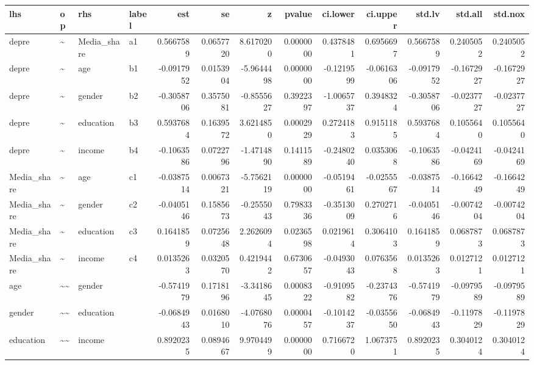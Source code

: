 \documentclass[
]{article}
\begin{document}
\begin{table}[!h]
\centering
\begin{tabular}[t]{llllrrrrrrrrr}
\toprule
lhs & op & rhs & label & est & se & z & pvalue & ci.lower & ci.upper & std.lv & std.all & std.nox\\
\midrule
depre & \textasciitilde{} & Media\_share & a1 & 0.5667589 & 0.0657720 & 8.6170200 & 0.0000000 & 0.4378481 & 0.6956697 & 0.5667589 & 0.2405052 & 0.2405052\\
depre & \textasciitilde{} & age & b1 & -0.0917952 & 0.0153904 & -5.9644498 & 0.0000000 & -0.1219599 & -0.0616306 & -0.0917952 & -0.1672927 & -0.1672927\\
depre & \textasciitilde{} & gender & b2 & -0.3058706 & 0.3575081 & -0.8555627 & 0.3922397 & -1.0065737 & 0.3948324 & -0.3058706 & -0.0237727 & -0.0237727\\
depre & \textasciitilde{} & education & b3 & 0.5937684 & 0.1639572 & 3.6214850 & 0.0002929 & 0.2724183 & 0.9151185 & 0.5937684 & 0.1055640 & 0.1055640\\
depre & \textasciitilde{} & income & b4 & -0.1063586 & 0.0722796 & -1.4714890 & 0.1411589 & -0.2480240 & 0.0353068 & -0.1063586 & -0.0424169 & -0.0424169\\
\addlinespace
Media\_share & \textasciitilde{} & age & c1 & -0.0387514 & 0.0067321 & -5.7562119 & 0.0000000 & -0.0519461 & -0.0255567 & -0.0387514 & -0.1664249 & -0.1664249\\
Media\_share & \textasciitilde{} & gender & c2 & -0.0405146 & 0.1585673 & -0.2555043 & 0.7983336 & -0.3513009 & 0.2702716 & -0.0405146 & -0.0074204 & -0.0074204\\
Media\_share & \textasciitilde{} & education & c3 & 0.1641859 & 0.0725648 & 2.2626094 & 0.0236598 & 0.0219614 & 0.3064103 & 0.1641859 & 0.0687873 & 0.0687873\\
Media\_share & \textasciitilde{} & income & c4 & 0.0135263 & 0.0320570 & 0.4219442 & 0.6730657 & -0.0493043 & 0.0763568 & 0.0135263 & 0.0127121 & 0.0127121\\
age & \textasciitilde{}\textasciitilde{} & gender &  & -0.5741979 & 0.1718196 & -3.3418645 & 0.0008322 & -0.9109582 & -0.2374376 & -0.5741979 & -0.0979589 & -0.0979589\\
\addlinespace
gender & \textasciitilde{}\textasciitilde{} & education &  & -0.0684943 & 0.0168010 & -4.0768076 & 0.0000457 & -0.1014237 & -0.0355650 & -0.0684943 & -0.1197829 & -0.1197829\\
education & \textasciitilde{}\textasciitilde{} & income &  & 0.8920235 & 0.0894667 & 9.9704499 & 0.0000000 & 0.7166720 & 1.0673751 & 0.8920235 & 0.3040124 & 0.3040124\\

\end{tabular}
\end{table}
\end{document}
